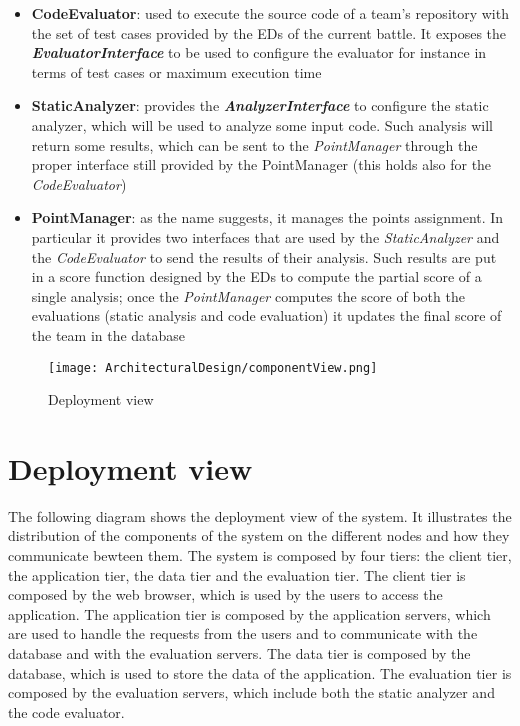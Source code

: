 \begin{itemize}
  \item \textbf{CodeEvaluator}: used to execute the source code of a team's repository with the set of test cases provided by the EDs of the current battle. It exposes the \textbf{\textit{EvaluatorInterface}} to be used to configure the evaluator for instance in terms of test cases or maximum execution time
  \item \textbf{StaticAnalyzer}: provides the \textbf{\textit{AnalyzerInterface}} to configure the static analyzer, which will be used to analyze some input code. Such analysis will return some results, which can be sent to the \textit{PointManager} through the proper interface still provided by the PointManager (this holds also for the \textit{CodeEvaluator})
  \item \textbf{PointManager}: as the name suggests, it manages the points assignment. In particular it provides two interfaces that are used by the \textit{StaticAnalyzer} and the \textit{CodeEvaluator} to send the results of their analysis. Such results are put in a score function designed by the EDs to compute the partial score of a single analysis; once the \textit{PointManager} computes the score of both the evaluations (static analysis and code evaluation) it updates the final score of the team in the database

\end{itemize}

\begin{figure}[H]
    \label{fig:component-view}
    \centering
    \texttt{[image: ArchitecturalDesign/componentView.png]}
    \caption{Deployment view}
\end{figure}
\newpage

\section{Deployment view}
\label{s:deployment-view}%

The following diagram shows the deployment view of the system. It illustrates the distribution of the components of the system on the different nodes and how they communicate bewteen them. The system is composed by four tiers: the client tier, the application tier, the data tier and the evaluation tier. The client tier is composed by the web browser, which is used by the users to access the application. The application tier is composed by the application servers, which are used to handle the requests from the users and to communicate with the database and with the evaluation servers. The data tier is composed by the database, which is used to store the data of the application. The evaluation tier is composed by the evaluation servers, which include both the static analyzer and the code evaluator.

